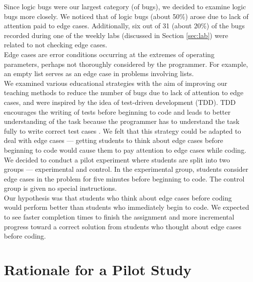 \documentclass[11pt,letterpaper]{article}
\begin{document}
Since logic bugs were our largest category (\numlogic of \numtotal bugs), we decided to examine logic bugs more closely. We noticed that \numedge of \numlogic logic bugs (about 50\%) arose due to lack of attention paid to edge cases. Additionally, six out of 31 (about 20\%) of the bugs recorded during one of the weekly labs (discussed in Section \ref{sec:lab}) were related to not checking edge cases.\\

Edge cases are error conditions occurring at the extremes of operating parameters, perhaps not thoroughly considered by the programmer. For example, an empty list serves as an edge case in problems involving lists.\\

We examined various educational strategies with the aim of improving our teaching methods to reduce the number of bugs due to lack of attention to edge cases, and were inspired by the idea of test-driven development (TDD). TDD encourages the writing of tests before beginning to code and leads to better understanding of the task because the programmer has to understand the task fully to write correct test cases \cite{ErdogmusMorisioTorchiano05}. We felt that this strategy could be adapted to deal with edge cases --- getting students to think about edge cases before beginning to code would cause them to pay attention to edge cases while coding.\\

We decided to conduct a pilot experiment where students are split into two groups --- experimental and control. In the experimental group, students consider edge cases in the problem for five minutes before beginning to code. The control group is given no special instructions.\\

Our hypothesis was that students who think about edge cases before coding would perform better than students who immediately begin to code. We expected to see faster completion times to finish the assignment and more incremental progress toward a correct solution from students who thought about edge cases before coding.

\section{Rationale for a Pilot Study}
\label{sec:pilot}
\end{document}
